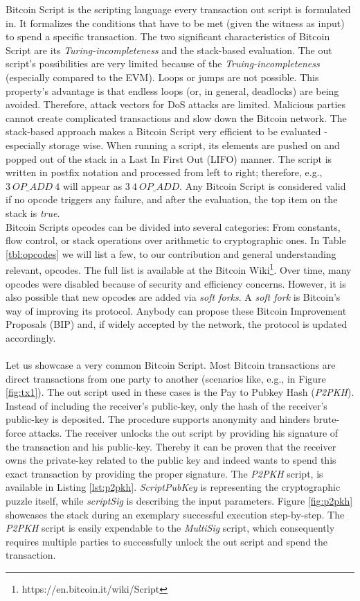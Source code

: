 \documentclass{cacthesis}
\newcounter{protocol}
\begin{document}
        Bitcoin Script is the scripting language every transaction out script is formulated in. It formalizes the conditions that have to be met (given the witness as input) to spend a specific transaction. The two significant characteristics of Bitcoin Script are its \textit{Turing-incompleteness} and the stack-based evaluation. The out script's possibilities are very limited because of the \textit{Truing-incompleteness} (especially compared to the EVM). Loops or jumps are not possible. This property's advantage is that endless loops (or, in general, deadlocks) are being avoided. Therefore, attack vectors for DoS attacks are limited. Malicious parties cannot create complicated transactions and slow down the Bitcoin network. The stack-based approach makes a Bitcoin Script very efficient to be evaluated - especially storage wise. When running a script, its elements are pushed on and popped out of the stack in a Last In First Out (LIFO) manner. The script is written in postfix notation and processed from left to right; therefore, e.g., $3\ OP\_ADD \ 4$ will appear as $3\ 4\ OP\_ADD$. Any Bitcoin Script is considered valid if no opcode triggers any failure, and after the evaluation, the top item on the stack is \textit{true}. \\
        Bitcoin Scripts opcodes can be divided into several categories: From constants, flow control, or stack operations over arithmetic to cryptographic ones. In Table \ref{tbl:opcodes} we will list a few, to our contribution and general understanding relevant, opcodes. The full list is available at the Bitcoin Wiki\footnote{https://en.bitcoin.it/wiki/Script}. Over time, many opcodes were disabled because of security and efficiency concerns. However, it is also possible that new opcodes are added via \textit{soft forks}. A \textit{soft fork} is Bitcoin's way of improving its protocol. Anybody can propose these Bitcoin Improvement Proposals (BIP) and, if widely accepted by the network, the protocol is updated accordingly. \\\\
        Let us showcase a very common Bitcoin Script. Most Bitcoin transactions are direct transactions from one party to another (scenarios like, e.g., in Figure \ref{fig:tx1}). The out script used in these cases is the Pay to Pubkey Hash (\textit{P2PKH}). Instead of including the receiver's public-key, only the hash of the receiver's public-key is deposited. The procedure supports anonymity and hinders brute-force attacks. The receiver unlocks the out script by providing his signature of the transaction and his public-key. Thereby it can be proven that the receiver owns the private-key related to the public key and indeed wants to spend this exact transaction by providing the proper signature. The \textit{P2PKH} script, is available in Listing \ref{lst:p2pkh}. \textit{ScriptPubKey} is representing the cryptographic puzzle itself, while \textit{scriptSig} is describing the input parameters. Figure \ref{fig:p2pkh} showcases the stack during an exemplary successful execution step-by-step. The \textit{P2PKH} script is easily expendable to the \textit{MultiSig} script, which consequently requires multiple parties to successfully unlock the out script and spend the transaction. \\
        
\end{document}
